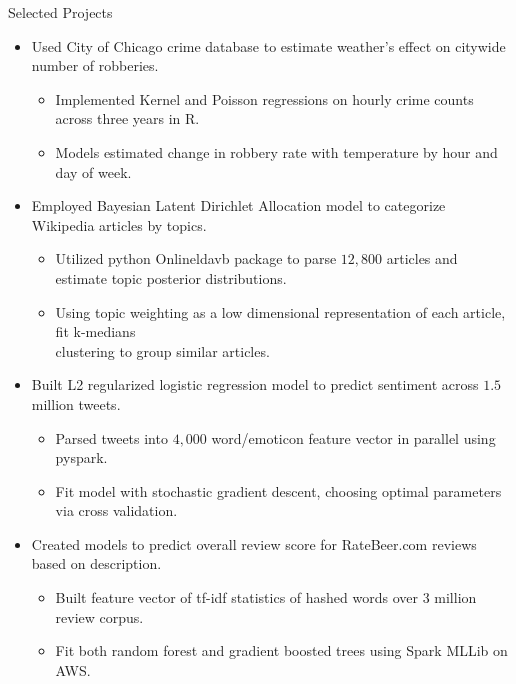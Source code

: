 \documentclass{resume} %
\begin{document}

\begin{rSection}{Selected Projects}
    \begin{itemize}
        \item Used City of Chicago crime database to estimate weather's effect on citywide number of robberies.
            \begin{itemize} 
                \item Implemented Kernel and Poisson regressions on hourly crime counts across three years in R.
                \item Models estimated change in robbery rate with temperature by hour and day of week.
            \end{itemize}
        \item Employed Bayesian Latent Dirichlet Allocation model to categorize Wikipedia articles by topics.
            \begin{itemize} 
                \item Utilized python Onlineldavb package to parse $12,800$ articles and estimate topic posterior distributions.   
                \item Using topic weighting as a low dimensional representation of each article, fit k-medians \\clustering to group similar articles.
            \end{itemize}
        \item Built L2 regularized logistic regression model to predict sentiment across $1.5$ million tweets.
            \begin{itemize} 
                \item Parsed tweets into $4,000$ word/emoticon feature vector in parallel using pyspark.
                \item Fit model with stochastic gradient descent, choosing optimal parameters via cross validation.
            \end{itemize}
        \item Created models to predict overall review score for RateBeer.com reviews based on description.
            \begin{itemize} 
                \item Built feature vector of tf-idf statistics of hashed words over 3 million review corpus.
                \item Fit both random forest and gradient boosted trees using Spark MLLib on AWS.
            \end{itemize}

    \end{itemize} 
\end{rSection}
\end{document}
